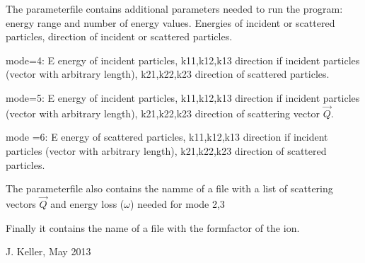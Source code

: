 \medskip 
The parameterfile contains additional parameters needed to run the program:
energy range and number of energy values. Energies of incident or scattered
particles, direction of incident  or scattered particles. 

mode=4: E energy of incident particles, k11,k12,k13 direction if incident
particles (vector with arbitrary length), k21,k22,k23 direction of scattered
particles. 

mode=5: E energy of incident particles, k11,k12,k13 direction if incident
particles (vector with arbitrary length), k21,k22,k23 direction of
scattering vector $\vec Q$.

mode =6: E energy of scattered  particles, k11,k12,k13 direction if incident
particles (vector with arbitrary length), k21,k22,k23 direction of
scattered particles. 

\medskip
The parameterfile also contains the namme of a file with  a list of
scattering vectors  $\vec Q$ and energy loss ($\omega$) needed for mode
2,3

 Finally it contains the name of a file with the formfactor of the ion.  

\bigskip

J. Keller, May 2013

%
